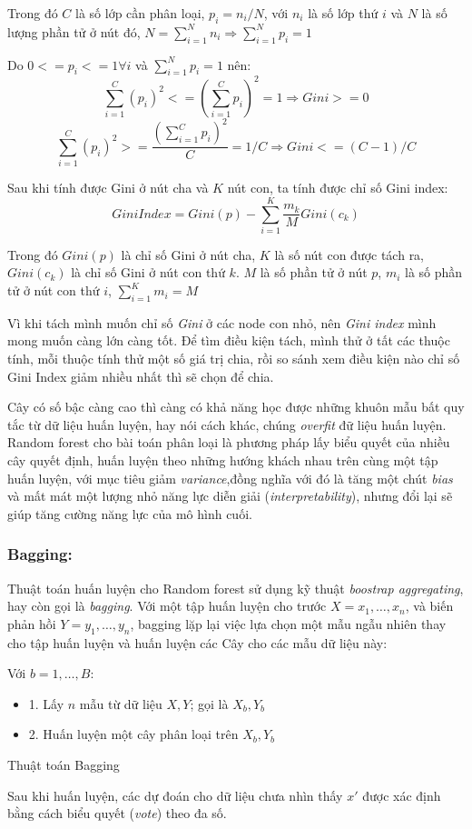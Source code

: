Trong đó $C$ là số lớp cần phân loại, $p_i = n_i/N$, với $n_i$ là số lớp thứ $i$ và $N$ là số lượng phần tử ở nút đó, $N = \sum^N_{i=1}n_i \Rightarrow \sum^N_{i=1}p_i = 1$

Do $0 <= p_i <= 1 \forall i$ và $\sum^N_{i=1}p_i=1$ nên:
\begin{equation*}
    \sum^C_{i=1}(p_i)^2 <= (\sum^C_{i=1}p_i)^2 = 1 \Rightarrow Gini >= 0
\end{equation*}
\begin{equation*}
    \sum^C_{i=1}(p_i)^2 >= \frac{(\sum^C_{i=1}p_i)^2}{C} = 1/C \Rightarrow Gini <= (C-1)/C
\end{equation*}

Sau khi tính được Gini ở nút cha và $K$ nút con, ta tính được chỉ số Gini index:
\begin{equation*}
    GiniIndex = Gini(p) - \sum^K_{i=1}\frac{m_k}{M}Gini(c_k)
\end{equation*}

Trong đó $Gini(p)$ là chỉ số Gini ở nút cha, $K$ là số nút con được tách ra, $Gini(c_k)$ là chỉ số Gini ở nút con thứ $k$. $M$ là số phần tử ở nút $p$, $m_i$ là số phần tử ở nút con thứ $i$, $\sum^K_{i=1}m_i = M$

Vì khi tách mình muốn chỉ số \emph{Gini} ở các node con nhỏ, nên \emph{Gini index} mình mong muốn càng lớn càng tốt. Để tìm điều kiện tách, mình thử ở tất các thuộc tính, mỗi thuộc tính thử một số giá trị chia, rồi so sánh xem điều kiện nào chỉ số Gini Index giảm nhiều nhất thì sẽ chọn để chia.

Cây có số bậc càng cao thì càng có khả năng học được những khuôn mẫu bất quy tắc từ dữ liệu huấn luyện, hay nói cách khác, chúng \emph{overfit} đữ liệu huấn luyện. Random forest cho bài toán phân loại là phương pháp lấy biểu quyết của nhiều cây quyết định, huấn luyện theo những hướng khách nhau trên cùng một tập huấn luyện, với mục tiêu giảm \emph{variance},đồng nghĩa với đó là tăng một chút \emph{bias} và mất mát một lượng nhỏ năng lực diễn giải (\emph{interpretability}), nhưng đổi lại sẽ giúp tăng cường năng lực của mô hình cuối.
\subsubsection{Bagging:} Thuật toán huấn luyện cho Random forest sử dụng kỹ thuật \emph{boostrap aggregating}, hay còn gọi là \emph{bagging}. Với một tập huấn luyện cho trước $X = x_1,\dots,x_n$, và biến phản hồi $Y=y_1,\dots,y_n$, bagging lặp lại việc lựa chọn một mẫu ngẫu nhiên thay cho tập huấn luyện và huấn luyện các Cây cho các mẫu dữ liệu này:
      \begin{algorithm}[h!]
          \DontPrintSemicolon
          Với $b = 1,\dots,B:$
          \begin{itemize}
              \item 1. Lấy $n$ mẫu từ dữ liệu $X, Y$; gọi là $X_b, Y_b$
              \item 2. Huấn luyện một cây phân loại trên $X_b, Y_b$
          \end{itemize}
          \caption{Thuật toán Bagging}
          \label{alg:Bagging}
      \end{algorithm}
      Sau khi huấn luyện, các dự đoán cho dữ liệu chưa nhìn thấy $x'$ được xác định bằng cách biểu quyết (\emph{vote}) theo đa số.
